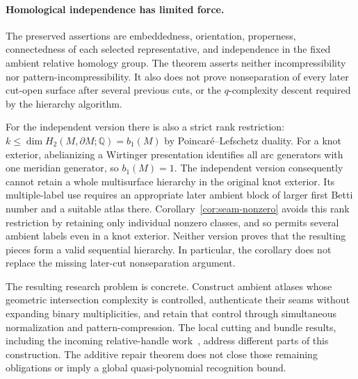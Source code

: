 \paragraph{Homological independence has limited force.}
The preserved assertions are embeddedness, orientation, properness,
connectedness of each selected representative, and independence in the
fixed ambient relative homology group.  The theorem asserts neither
incompressibility nor pattern-incompressibility.  It also does not prove
nonseparation of every later cut-open surface after several previous cuts,
or the $q$-complexity descent required by the hierarchy algorithm.

For the independent version there is also a strict rank restriction:
$k\leq\dim H_2(M,\partial M;\mathbb Q)=b_1(M)$ by
Poincar\'e--Lefschetz duality.  For a knot exterior, abelianizing a
Wirtinger presentation identifies all arc generators with one meridian
generator, so $b_1(M)=1$.  The independent version consequently cannot
retain a whole multisurface hierarchy in the original knot exterior.
Its multiple-label use requires an appropriate later ambient block of
larger first Betti number and a suitable atlas there.
Corollary~\ref{cor:seam-nonzero} avoids this rank restriction by retaining
only individual nonzero classes, and so permits several ambient labels
even in a knot exterior.  Neither version proves that the resulting
pieces form a valid sequential hierarchy.  In particular, the corollary
does not replace the missing later-cut nonseparation argument.

The resulting research problem is concrete.  Construct ambient atlases
whose geometric intersection complexity is controlled, authenticate their
seams without expanding binary multiplicities, and retain that control
through simultaneous normalization and pattern-compression.  The local
cutting and bundle results, including the incoming relative-handle
work~\cite{incoming-hierarchy-kernels}, address different parts of this
construction.  The additive repair theorem does not close those remaining
obligations or imply a global quasi-polynomial recognition bound.
